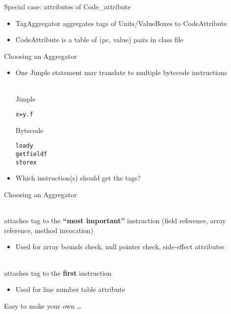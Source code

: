 \begin{slide}{Special case: attributes of Code\_attribute}

\begin{itemize}
\item {\red TagAggregator} aggregates tags of Units/ValueBoxes to {\red CodeAttribute}
\item CodeAttribute is a table of (pc, value) pairs in class file
\end{itemize}
\end{slide}

\begin{slide}{Choosing an Aggregator}
\begin{itemize}
\item One Jimple statement may translate to multiple bytecode instructions\\
\ \\
\begin{minipage}[t]{45mm}
Jimple
\begin{alltt}
x = y.f
\end{alltt}
\end{minipage}
\begin{minipage}[t]{45mm}
Bytecode
\begin{alltt}
load y
getfield f
store x
\end{alltt}
\end{minipage}
\item Which instruction(s) should get the tags?
\end{itemize}
\end{slide}

\begin{slide}{Choosing an Aggregator}
\begin{description}
\item [ImportantTagAggregator]\ \\
attaches tag to the {\bf ``most important''} instruction
(field reference, array reference, method invocation)
\begin{itemize}
\item Used for array bounds check, null pointer check, side-effect attributes
\end{itemize}
\item [FirstTagAggregator]\ \\
attaches tag to the {\bf first} instruction
\begin{itemize}
\item Used for line number table attribute
\end{itemize}
\item Easy to make your own \ldots
\end{description}
\end{slide}


